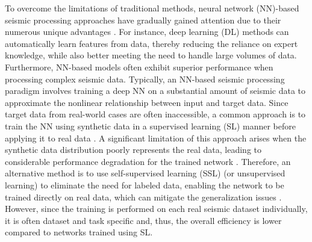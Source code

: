 To overcome the limitations of traditional methods, neural network (NN)-based seismic processing approaches have gradually gained attention due to their numerous unique advantages \citep{yu2021deep, mousavi2022deep, mousavi2024applications}. For instance, deep learning (DL) methods can automatically learn features from data, thereby reducing the reliance on expert knowledge, while also better meeting the need to handle large volumes of data. Furthermore, NN-based models often exhibit superior performance when processing complex seismic data. Typically, an NN-based seismic processing paradigm involves training a deep NN on a substantial amount of seismic data to approximate the nonlinear relationship between input and target data. Since target data from real-world cases are often inaccessible, a common approach is to train the NN using synthetic data in a supervised learning (SL) manner before applying it to real data \citep{yu2019deep, wang2019deep, dong2019desert, wu2019faultseg3d, wu2020building, zhang2021deep, dong2024can, dong2024seismic}. A significant limitation of this approach arises when the synthetic data distribution poorly represents the real data, leading to considerable performance degradation for the trained network \citep{alkhalifah2022mlreal, zhang2022improving}. Therefore, an alternative method is to use self-supervised learning (SSL) (or unsupervised learning) to eliminate the need for labeled data, enabling the network to be trained directly on real data, which can mitigate the generalization issues \citep{saad2020deep, birnie2021potential, liu2023trace, liu2024self, liu2024gabor, saad2024noise, cheng2024effective, cheng2024self}. However, since the training is performed on each real seismic dataset individually, it is often dataset and task specific and, thus, the overall efficiency is lower compared to networks trained using SL. 


